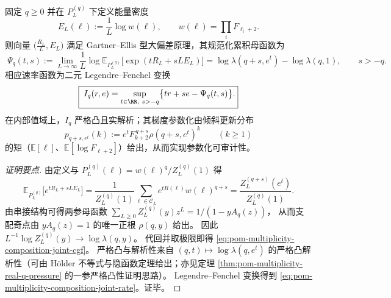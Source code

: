 \begin{theorem}\label{thm:pom-multiplicity-composition-joint-ldp-partcount-energy}
固定 \(q\ge 0\) 并在 \(P_L^{(q)}\) 下定义能量密度
\[
E_L(\boldsymbol{\ell}):=\frac{1}{L}\log w(\boldsymbol{\ell}),
\qquad
w(\boldsymbol{\ell})=\prod_i F_{\ell_i+2}.
\]
则向量 \(\bigl(\frac{R_L}{L},E_L\bigr)\) 满足 Gartner--Ellis 型大偏差原理，其规范化累积母函数为
\begin{equation}\label{eq:pom-multiplicity-composition-joint-cgf}
\boxed{\;
\Psi_q(t,s)
:=\lim_{L\to\infty}\frac{1}{L}\log \mathbb{E}_{P_L^{(q)}}\!\big[\exp(tR_L+sLE_L)\big]
=\log \lambda(q+s,e^{t})-\log\lambda(q,1),\qquad s>-q.}
\end{equation}
相应速率函数为二元 Legendre--Fenchel 变换
\begin{equation}\label{eq:pom-multiplicity-composition-joint-rate}
\boxed{\;
I_q(r,e)=\sup_{t\in\RR,\ s>-q}\bigl\{tr+se-\Psi_q(t,s)\bigr\}.}
\end{equation}
在内部值域上，\(I_q\) 严格凸且实解析；其梯度参数化由倾斜更新分布
\[
p_{q+s,e^t}(k):=e^{t}F_{k+2}^{\,q+s}\rho(q+s,e^t)^{k}\qquad(k\ge 1)
\]
的矩（\(\mathbb{E}[\ell]\)、\(\mathbb{E}[\log F_{\ell+2}]\)）给出，从而实现参数化可审计性。
\end{theorem}
\begin{proof}[证明要点]
由定义与 \(P_L^{(q)}(\boldsymbol{\ell})=w(\boldsymbol{\ell})^q/Z_L^{(q)}(1)\) 得
\[
\mathbb{E}_{P_L^{(q)}}\!\big[e^{tR_L+sLE_L}\big]
=\frac{1}{Z_L^{(q)}(1)}\sum_{\boldsymbol{\ell}\in\mathcal{C}_L}e^{tR(\boldsymbol{\ell})}w(\boldsymbol{\ell})^{q+s}
=\frac{Z_L^{(q+s)}(e^t)}{Z_L^{(q)}(1)}.
\]
由串接结构可得两参母函数
\(
\sum_{L\ge 0}Z_L^{(q)}(y)z^L=1/(1-yA_q(z))
\)，
从而支配奇点由 \(yA_q(z)=1\) 的唯一正根 \(\rho(q,y)\) 给出。
因此
\(
L^{-1}\log Z_L^{(q)}(y)\to \log\lambda(q,y)
\)。
代回并取极限即得 \eqref{eq:pom-multiplicity-composition-joint-cgf}。
严格凸与解析性来自 \((q,t)\mapsto\log\lambda(q,e^t)\) 的严格凸解析性（可由 H\"older 不等式与隐函数定理给出；亦见定理 \ref{thm:pom-multiplicity-real-q-pressure} 的一参严格凸性证明思路）。
Legendre--Fenchel 变换得到 \eqref{eq:pom-multiplicity-composition-joint-rate}。证毕。
\end{proof}

